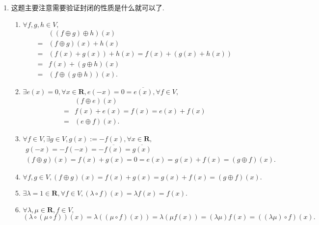 \begin{solution}
\begin{enumerate}
                \item 这题主要注意需要验证封闭的性质是什么就可以了.
                \begin{enumerate}
                    \item $\forall f, g, h \in V,$
                    \begin{align*}
                        & ((f \oplus g) \oplus h)(x) \\ ={} & (f \oplus g)(x)+h(x) \\ ={} & (f(x)+g(x))+h(x) = f(x)+(g(x)+h(x)) \\ ={} & f(x)+ (g \oplus h)(x) \\={} & (f \oplus (g \oplus h))(x).
                    \end{align*}

                    \item $\exists e(x)=0, \forall x \in \mathbf{R}, e(-x)=0=\overline{e(x)}, \forall f \in V,$
                    \begin{align*}
                        & (f \oplus e)(x) \\={} & f(x) + e(x) = f(x) = e(x) + f(x) \\ ={} & (e \oplus f)(x).
                    \end{align*}

                    \item $\forall f \in V, \exists g \in V, g(x) := -f(x), \forall x \in \mathbf{R},$
                    \begin{gather*}
                        g(-x) = -f(-x) = -\overline{f(x)} = \overline{g(x)} \\
                        (f \oplus g)(x) = f(x)+g(x) = 0 = e(x) = g(x) + f(x) = (g \oplus f)(x).
                    \end{gather*}

                    \item $\forall f, g \in V, (f \oplus g)(x) = f(x)+g(x) = g(x)+f(x) = (g \oplus f)(x).$

                    \item $\exists \lambda = 1 \in \mathbf{R}, \forall f \in V, (\lambda \circ f)(x) = \lambda f(x) = f(x)$.

                    \item $\forall \lambda, \mu \in \mathbf{R}, f \in V,$
                    \[(\lambda \circ (\mu \circ f))(x) = \lambda((\mu \circ f)(x)) = \lambda (\mu f(x)) = (\lambda \mu) f(x) = ((\lambda \mu) \circ f)(x).\]


\end{enumerate}
\end{enumerate}
\end{solution}
